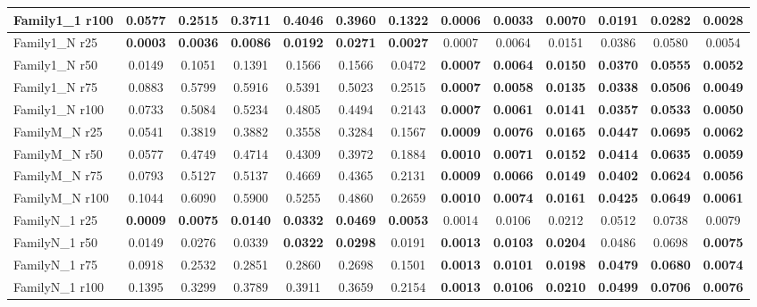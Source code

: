 \begin{table}[t]
{\begin{tabular}{l||cccccc||cccccc}
Family1\_1 r100 & 0.0577 & 0.2515 & 0.3711 & 0.4046 & 0.3960 & 0.1322 & \textbf{0.0006} & \textbf{0.0033} & \textbf{0.0070} & \textbf{0.0191} & \textbf{0.0282} & \textbf{0.0028} \\
\hline
Family1\_N r25 & \textbf{0.0003} & \textbf{0.0036} & \textbf{0.0086} & \textbf{0.0192} & \textbf{0.0271} & \textbf{0.0027} & 0.0007 & 0.0064 & 0.0151 & 0.0386 & 0.0580 & 0.0054 \\
Family1\_N r50 & 0.0149 & 0.1051 & 0.1391 & 0.1566 & 0.1566 & 0.0472 & \textbf{0.0007} & \textbf{0.0064} & \textbf{0.0150} & \textbf{0.0370} & \textbf{0.0555} & \textbf{0.0052} \\
Family1\_N r75 & 0.0883 & 0.5799 & 0.5916 & 0.5391 & 0.5023 & 0.2515 & \textbf{0.0007} & \textbf{0.0058} & \textbf{0.0135} & \textbf{0.0338} & \textbf{0.0506} & \textbf{0.0049} \\
Family1\_N r100 & 0.0733 & 0.5084 & 0.5234 & 0.4805 & 0.4494 & 0.2143 & \textbf{0.0007} & \textbf{0.0061} & \textbf{0.0141} & \textbf{0.0357} & \textbf{0.0533} & \textbf{0.0050} \\
\hline
FamilyM\_N r25 & 0.0541 & 0.3819 & 0.3882 & 0.3558 & 0.3284 & 0.1567 & \textbf{0.0009} & \textbf{0.0076} & \textbf{0.0165} & \textbf{0.0447} & \textbf{0.0695} & \textbf{0.0062} \\
FamilyM\_N r50 & 0.0577 & 0.4749 & 0.4714 & 0.4309 & 0.3972 & 0.1884 & \textbf{0.0010} & \textbf{0.0071} & \textbf{0.0152} & \textbf{0.0414} & \textbf{0.0635} & \textbf{0.0059} \\
FamilyM\_N r75 & 0.0793 & 0.5127 & 0.5137 & 0.4669 & 0.4365 & 0.2131 & \textbf{0.0009} & \textbf{0.0066} & \textbf{0.0149} & \textbf{0.0402} & \textbf{0.0624} & \textbf{0.0056} \\
FamilyM\_N r100 & 0.1044 & 0.6090 & 0.5900 & 0.5255 & 0.4860 & 0.2659 & \textbf{0.0010} & \textbf{0.0074} & \textbf{0.0161} & \textbf{0.0425} & \textbf{0.0649} & \textbf{0.0061} \\
\hline
FamilyN\_1 r25 & \textbf{0.0009} & \textbf{0.0075} & \textbf{0.0140} & \textbf{0.0332} & \textbf{0.0469} & \textbf{0.0053} & 0.0014 & 0.0106 & 0.0212 & 0.0512 & 0.0738 & 0.0079 \\
FamilyN\_1 r50 & 0.0149 & 0.0276 & 0.0339 & \textbf{0.0322} & \textbf{0.0298} & 0.0191 & \textbf{0.0013} & \textbf{0.0103} & \textbf{0.0204} & 0.0486 & 0.0698 & \textbf{0.0075} \\
FamilyN\_1 r75 & 0.0918 & 0.2532 & 0.2851 & 0.2860 & 0.2698 & 0.1501 & \textbf{0.0013} & \textbf{0.0101} & \textbf{0.0198} & \textbf{0.0479} & \textbf{0.0680} & \textbf{0.0074} \\
FamilyN\_1 r100 & 0.1395 & 0.3299 & 0.3789 & 0.3911 & 0.3659 & 0.2154 & \textbf{0.0013} & \textbf{0.0106} & \textbf{0.0210} & \textbf{0.0499} & \textbf{0.0706} & \textbf{0.0076} \\
\hline
\end{tabular}%
}
\end{table}
